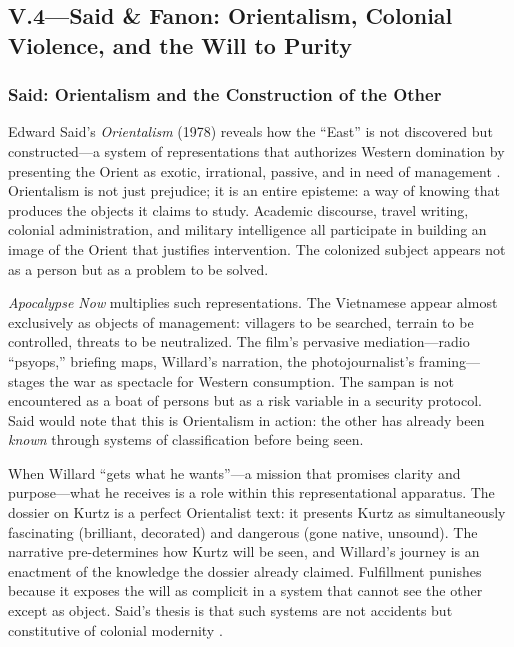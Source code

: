 \subsection*{V.4—Said \& Fanon: Orientalism, Colonial Violence, and the Will to Purity}
\label{ssec:v-said-fanon}

\subsubsection*{Said: Orientalism and the Construction of the Other}
Edward Said's \textit{Orientalism} (1978) reveals how the ``East'' is not discovered but
constructed---a system of representations that authorizes Western domination by presenting the
Orient as exotic, irrational, passive, and in need of management \parencite{SaidOrientalism1978}.
Orientalism is not just prejudice; it is an entire episteme: a way of knowing that produces the
objects it claims to study. Academic discourse, travel writing, colonial administration, and
military intelligence all participate in building an image of the Orient that justifies
intervention. The colonized subject appears not as a person but as a problem to be solved.

\textit{Apocalypse Now} multiplies such representations. The Vietnamese appear almost
exclusively as objects of management: villagers to be searched, terrain to be controlled,
threats to be neutralized. The film's pervasive mediation---radio ``psyops,'' briefing maps,
Willard's narration, the photojournalist's framing---stages the war as spectacle for Western
consumption. The sampan is not encountered as a boat of persons but as a risk variable in a
security protocol. Said would note that this is Orientalism in action: the other has already
been \emph{known} through systems of classification before being seen.

When Willard ``gets what he wants''---a mission that promises clarity and purpose---what he
receives is a role within this representational apparatus. The dossier on Kurtz is a perfect
Orientalist text: it presents Kurtz as simultaneously fascinating (brilliant, decorated) and
dangerous (gone native, unsound). The narrative pre-determines how Kurtz will be seen, and
Willard's journey is an enactment of the knowledge the dossier already claimed. Fulfillment
punishes because it exposes the will as complicit in a system that cannot see the other except
as object. Said's thesis is that such systems are not accidents but constitutive of colonial
modernity \parencite{SaidOrientalism1978}.

